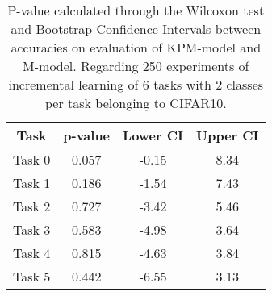 \begin{table}[H]
\centering
\begin{tabular}{cccc}
\toprule
Task & p-value & Lower CI & Upper CI \\
\midrule
Task 0 & 0.057 &-0.15 & 8.34 \\
Task 1 & 0.186 &-1.54 & 7.43 \\
Task 2 & 0.727 &-3.42 & 5.46 \\
Task 3 & 0.583 &-4.98 & 3.64 \\
Task 4 & 0.815 &-4.63 & 3.84 \\
Task 5 & 0.442 &-6.55 & 3.13 \\
\bottomrule
\end{tabular}
\caption{P-value calculated through the Wilcoxon test and Bootstrap Confidence Intervals between accuracies on evaluation of KPM-model and M-model. Regarding 250 experiments of incremental learning of 6 tasks with 2 classes per task belonging to CIFAR10.}
\end{table}
